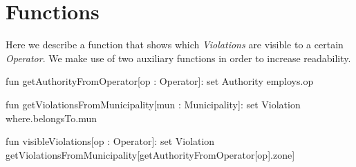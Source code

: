 \section{Functions}
Here we describe a function that shows which \emph{Violations} are visible to
a certain \emph{Operator}. We make use of two auxiliary functions in order to
increase readability.

\begin{alloy}
    fun getAuthorityFromOperator[op : Operator]: set Authority {
        employs.op
    }

    fun getViolationsFromMunicipality[mun : Municipality]: set Violation{
        where.belongsTo.mun
    }

    fun visibleViolations[op : Operator]: set Violation{
        getViolationsFromMunicipality[getAuthorityFromOperator[op].zone]
    }
\end{alloy}